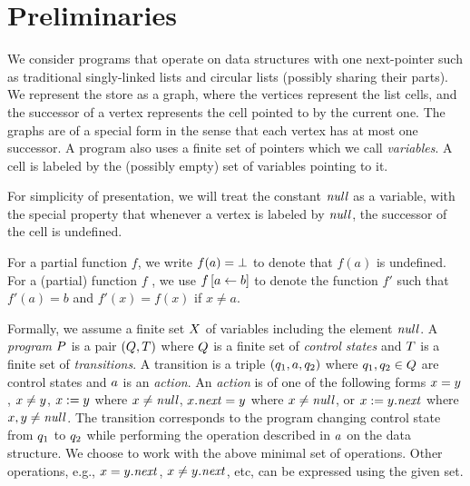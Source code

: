 %
\section{Preliminaries}
\label{section:prels}
%
We consider programs that operate on data structures
with one next-pointer such as traditional singly-linked lists and circular
lists (possibly sharing their parts).
%
We represent the store as a graph, where the vertices represent the list cells,
and the successor of a vertex represents the cell pointed to by the current one.
%
The graphs are of a special form in the sense that each vertex has at most one successor.
%
A program also uses a finite set of pointers which we call {\it variables}.
%
A cell is labeled by the (possibly empty) set of variables pointing to it.
%

For simplicity of presentation, we will treat the constant ${\it null}$ as a
variable, with the special property that whenever a vertex is labeled by ${\it null}$,
the successor of the cell is undefined.

%
%
For a partial function $f$, we write $f(a)=\bot$ to denote that $f(a)$ is undefined.
%
For a (partial) function $f$ , we use
$f\left[a\leftarrow b\right]$ to denote the function $f'$ such that
$f'(a)=b$ and $f'(x)=f(x)$ if $x\neq a$.
%
%
%
%
%

Formally, we assume a finite set $X$ of variables including the element
${\it null}$.
%
A {\it program} $P$ is a pair $\left(Q,T\right)$
where $Q$ is a finite set of {\it control states} and
$T$ is a finite set of {\it transitions}. 
%
A transition is a triple $\left(q_1,a,q_2\right)$ where
$q_1,q_2\in Q$ are control states and $a$ is an {\it action}.
%
An {\it action} is of one of the following forms
$x=y$, $x\neq y$,
$x:=y$ where $x\neq{\it null}$,
$x.{\it next}=y$ where $x\neq{\it null}$,
or
$x:=y.{\it next}$ where $x,y\neq{\it null}$.
%
The transition corresponds to the program changing control state from
$q_1$ to $q_2$ while performing the operation described in $a$ on the data structure.
%
We choose to work with the above minimal set of operations.
%
Other operations, e.g., $x=y.{\it next}$, $x\neq y.{\it next}$, etc, can be expressed
using the given set.


